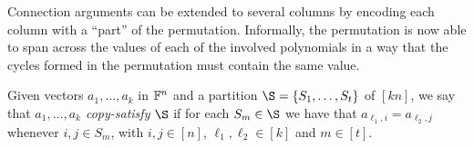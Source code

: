 
Connection arguments can be extended to several columns by encoding each column with a ``part'' of the permutation. Informally, the permutation is now able to span across the values of each of the involved polynomials in a way that the cycles formed in the permutation must contain the same value.
\begin{definition}
    Given vectors $a_1,\dots,a_k$ in $\mathbb{F}^n$ and a partition $\S = \{S_1,\dots,S_t\}$ of $[kn]$, we say that \textit{$a_1,\dots,a_k$ copy-satisfy $\S$} if for each $S_m \in \S$ we have that $a_{\ell_1,i} = a_{\ell_2,j}$ whenever $i, j \in S_m$, with $i,j \in [n]$, $\ell_1,\ell_2 \in [k]$ and $m \in [t]$.
\end{definition}

    
    
    

